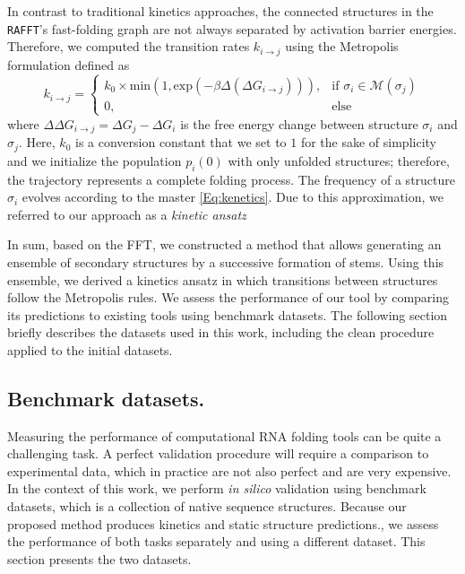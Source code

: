 In contrast to traditional kinetics approaches, the connected structures in the \texttt{RAFFT}'s fast-folding graph are not always separated by activation barrier energies. Therefore, we computed the transition rates $k_{i\rightarrow j}$ using the Metropolis \cite{klemm2008funnels} formulation defined as
\begin{equation}
\label{Eq:metropolis}
k_{i\rightarrow j} = \begin{cases}
k_0 \times \text{min}(1, \text{exp}(-\beta \Delta (\Delta G_{i \rightarrow j}))),& \text{if } \sigma_i \in \mathcal{M}(\sigma_j) \\
0,& \text{else }
\end{cases}
\end{equation}
where \(\Delta \Delta G_{i\rightarrow j} = \Delta G_j - \Delta G_i\) is the free energy change between structure \(\sigma_i\) and \(\sigma_j\). Here, \(k_0\) is a conversion constant that we set to $1$ for the sake of simplicity and we initialize the population \(p_i(0)\) with only unfolded structures; therefore, the trajectory represents a complete folding process. The frequency of a structure \(\sigma_i\) evolves according to the master \autoref{Eq:kenetics}. Due to this approximation, we referred to our approach as a \textit{kinetic ansatz}

In sum, based on the \ac{FFT}, we constructed a method that allows generating an ensemble of secondary structures by a successive formation of stems. Using this ensemble, we derived a kinetics ansatz in which transitions between structures follow the Metropolis rules. We assess the performance of our tool by comparing its predictions to existing tools using benchmark datasets. The following section briefly describes the datasets used in this work, including the clean procedure applied to the initial datasets.

\subsection{Benchmark datasets. }

Measuring the performance of computational RNA folding tools can be quite a challenging task. A perfect validation procedure will require a comparison to experimental data, which in practice are not also perfect and are very expensive. In the context of this work, we perform \textit{in silico} validation using benchmark datasets, which is a collection of native sequence structures. Because our proposed method produces kinetics and static structure predictions., we assess the performance of both tasks separately and using a different dataset. This section presents the two datasets.

